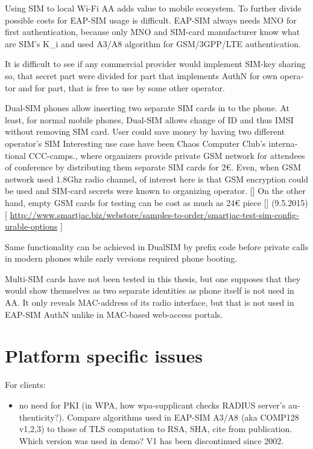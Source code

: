 \documentclass[12pt,a4paper,english]{tutthesis}
\begin{document}
\begin{otherlanguage}{english}
Using SIM to local Wi-Fi AA adds value to mobile ecosystem.
To further divide possible costs for EAP-SIM usage
is difficult.
EAP-SIM always needs MNO for first authentication,
because only MNO and SIM-card manufacturer know 
what are SIM's K\_i and used A3/A8 algorithm
for GSM/3GPP/LTE authentication.

It is difficult to see if any commercial provider would implement
SIM-key sharing so, that secret part were divided for part that
implements AuthN for own operator and for part, that is free to use by
some other operator.  

Dual-SIM phones allow inserting two separate SIM cards in to the
phone.
At least, for normal mobile phones, Dual-SIM allows change of ID and
thus IMSI without removing SIM card.
User could save money by having two different operator's SIM
Interesting use case have been Chaos Computer Club's international 
CCC-camps.\cite{}, where organizers 
provide private GSM network for attendees of conference
by distributing them separate SIM cards for 2€.
Even, when GSM network used 1.8Ghz radio channel, of interest here is
that GSM encryption could be used and SIM-card secrets were known to
organizing operator. [\cite{28C3}]
On the other hand, empty GSM cards for testing can be cost as much as 
24€ piece [\cite{smartjac.biz}] (9.5.2015)
[
\url{http://www.smartjac.biz/webstore/samples-to-order/smartjac-test-sim-configurable-options} ]




\begin{quote}
\end{quote}

Same functionality can be achieved in DualSIM by prefix code before
private calls in modern phones while early versions required 
phone booting.

Multi-SIM cards have not been tested in this thesis, but one supposes
that they would show themselves as two separate identities as 
phone itself is not used in AA. It only reveals  MAC-address of its
radio interface, but that is not used in EAP-SIM AuthN unlike in MAC-based web-access portals.


\section{Platform specific issues}
\label{sec-6-4}

For clients: 
\begin{itemize}
\item no need for PKI (in WPA, how wpa-supplicant checks RADIUS server's
authenticity?). Compare algorithms used in EAP-SIM A3/A8 (aka
COMP128 v1,2,3) to those of
TLS computation to RSA, SHA, cite from publication.
Which version was used in demo? V1 has been discontinued since 2002.


\end{itemize}
\end{otherlanguage}
\end{document}
